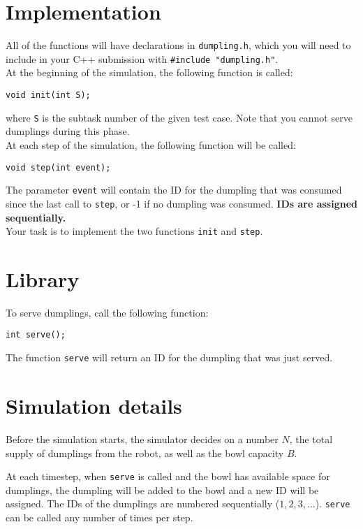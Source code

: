\documentclass{article}
\begin{document}
\section*{Implementation}

All of the functions will have declarations in {\tt dumpling.h}, which you will need to include in your C++ submission with {\tt \#include "dumpling.h"}. \\

\noindent At the beginning of the simulation, the following function is called:
\begin{verbatim}
void init(int S);
\end{verbatim}
where {\tt S} is the subtask number of the given test case. Note that you cannot serve dumplings during this phase. \\

\noindent At each step of the simulation, the following function will be called:
\begin{verbatim}
void step(int event);
\end{verbatim}
The parameter {\tt event} will contain the ID for the dumpling that was consumed since the last call to {\tt step}, or -1 if no dumpling was consumed. {\bf IDs are assigned sequentially.} \\

\noindent Your task is to implement the two functions {\tt init} and {\tt step}.

\section*{Library}

To serve dumplings, call the following function:
\begin{verbatim}
int serve();
\end{verbatim}
The function {\tt serve} will return an ID for the dumpling that was just served.

\section*{Simulation details}

Before the simulation starts, the simulator decides on a number $N$, the total supply of dumplings from the robot, as well as the bowl capacity $B$.

At each timestep, when {\tt serve} is called and the bowl has available space for dumplings, the dumpling will be added to the bowl and a new ID will be assigned. The IDs of the dumplings are numbered sequentially ($1, 2, 3, \dots$). {\tt serve} can be called any number of times per step.
\end{document}
